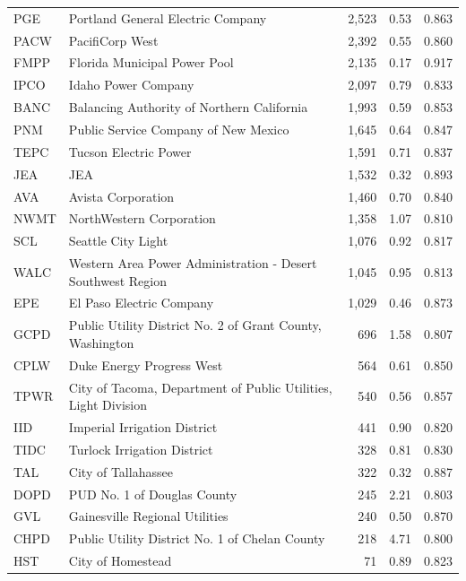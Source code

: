 \begin{tabular}{@{}llrrr@{}}
PGE & Portland General Electric Company & 2,523 & 0.53 & 0.863 \\
PACW & PacifiCorp West & 2,392 & 0.55 & 0.860 \\
FMPP & Florida Municipal Power Pool & 2,135 & 0.17 & 0.917 \\
IPCO & Idaho Power Company & 2,097 & 0.79 & 0.833 \\
BANC & Balancing Authority of Northern California & 1,993 & 0.59 & 0.853 \\
PNM & Public Service Company of New Mexico & 1,645 & 0.64 & 0.847 \\
TEPC & Tucson Electric Power & 1,591 & 0.71 & 0.837 \\
JEA & JEA & 1,532 & 0.32 & 0.893 \\
AVA & Avista Corporation & 1,460 & 0.70 & 0.840 \\
NWMT & NorthWestern Corporation & 1,358 & 1.07 & 0.810 \\
SCL & Seattle City Light & 1,076 & 0.92 & 0.817 \\
WALC & Western Area Power Administration - Desert Southwest Region & 1,045 & 0.95 & 0.813 \\
EPE & El Paso Electric Company & 1,029 & 0.46 & 0.873 \\
GCPD & Public Utility District No. 2 of Grant County, Washington & 696 & 1.58 & 0.807 \\
CPLW & Duke Energy Progress West & 564 & 0.61 & 0.850 \\
TPWR & City of Tacoma, Department of Public Utilities, Light Division & 540 & 0.56 & 0.857 \\
IID & Imperial Irrigation District & 441 & 0.90 & 0.820 \\
TIDC & Turlock Irrigation District & 328 & 0.81 & 0.830 \\
TAL & City of Tallahassee & 322 & 0.32 & 0.887 \\
DOPD & PUD No. 1 of Douglas County & 245 & 2.21 & 0.803 \\
GVL & Gainesville Regional Utilities & 240 & 0.50 & 0.870 \\
CHPD & Public Utility District No. 1 of Chelan County & 218 & 4.71 & 0.800 \\
HST & City of Homestead & 71 & 0.89 & 0.823 \\
\bottomrule
\end{tabular}
